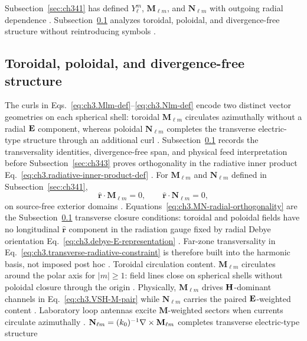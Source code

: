 Subsection~\ref{sec:ch341} has defined \(Y_{\ell}^{m}\), \(\mathbf{M}_{\ell m}\), and \(\mathbf{N}_{\ell m}\) with
outgoing radial dependence . Subsection~\ref{sec:ch342} analyzes toroidal,
poloidal, and divergence-free structure without reintroducing symbols .
\subsection{Toroidal, poloidal, and divergence-free structure}
\label{sec:ch342}
The curls in Eqs.~\eqref{eq:ch3.Mlm-def}--\eqref{eq:ch3.Nlm-def} encode two distinct vector geometries on each
spherical shell: toroidal $\mathbf{M}_{\ell m}$ circulates azimuthally without a radial $\mathbf{E}$ component, whereas
poloidal $\mathbf{N}_{\ell m}$ completes the transverse electric-type structure through an additional curl
\cite{tai1994,stratton1941}.
Subsection~\ref{sec:ch342} records the transversality identities, divergence-free span, and physical feed
interpretation before Subsection~\ref{sec:ch343} proves orthogonality in the radiative inner product
Eq.~\eqref{eq:ch3.radiative-inner-product-def} \cite{hansen1988}.
For \(\mathbf{M}_{\ell m}\) and \(\mathbf{N}_{\ell m}\) defined in Subsection~\ref{sec:ch341},
\begin{equation}
\label{eq:ch3.MN-radial-orthogonality}
\hat{\mathbf{r}}\cdot\mathbf{M}_{\ell m}=0,
\qquad
\hat{\mathbf{r}}\cdot\mathbf{N}_{\ell m}=0,
\end{equation}
on source-free exterior domains \cite{stratton1941}. Equations~\eqref{eq:ch3.MN-radial-orthogonality}
are the Subsection~\ref{sec:ch342} transverse closure conditions: toroidal and poloidal fields have no longitudinal
\(\hat{\mathbf{r}}\) component in the radiation gauge fixed by radial Debye orientation
Eq.~\eqref{eq:ch3.debye-E-representation} \cite{tai1994}. Far-zone transversality in
Eq.~\eqref{eq:ch3.transverse-radiative-constraint} is therefore built into the harmonic basis, not imposed
post hoc \cite{stratton1941}.
Toroidal circulation content. \(\mathbf{M}_{\ell m}\) circulates around the polar axis for \(|m|\ge1\): field lines close on spherical shells
without poloidal closure through the origin \cite{hansen1988}. Physically, \(\mathbf{M}_{\ell m}\) drives
\(\mathbf{H}\)-dominant channels in Eq.~\eqref{eq:ch3.VSH-M-pair} while \(\mathbf{N}_{\ell m}\) carries the paired
\(\mathbf{E}\)-weighted content \cite{stratton1941}. Laboratory loop antennas excite \(\mathbf{M}\)-weighted sectors when
currents circulate azimuthally \cite{harrington2001}.
\(\mathbf{N}_{\ell m}=(k_{0})^{-1}\nabla\times\mathbf{M}_{\ell m}\) completes transverse electric-type structure
